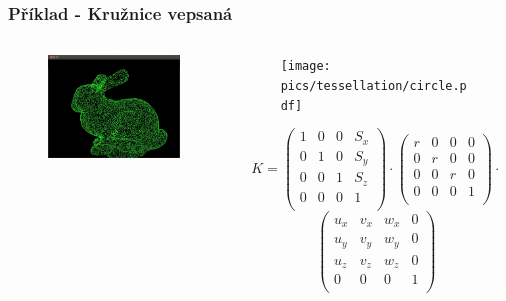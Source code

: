 \begin{frame}[fragile]
    \frametitle{Příklad - Kružnice vepsaná}
  \begin{columns}[T]
    \begin{column}{.44\textwidth}
	    \begin{figure}[h]
    		\includegraphics[width=5cm,keepaspectratio]{pics/tessellation/ts_circle}
    	\end{figure}
    \end{column}
    \begin{column}{.48\textwidth}
 	    \begin{figure}[h]
    		\texttt{[image: pics/tessellation/circle.pdf]}
    	\end{figure}
{\tiny
$$
K=
\left( 
\begin{array}{cccc} 
1 & 0 & 0 & S_x \\
0 & 1 & 0 & S_y \\
0 & 0 & 1 & S_z \\
0 & 0 & 0 & 1  \\
\end{array}
\right)
\cdot
\left( 
\begin{array}{cccc} 
r & 0 & 0 & 0 \\
0 & r & 0 & 0 \\
0 & 0 & r & 0 \\
0 & 0 & 0 & 1  \\
\end{array}
\right)
\cdot$$
$$
\left( 
\begin{array}{cccc} 
u_x & v_x & w_x & 0 \\
u_y & v_y & w_y & 0 \\
u_z & v_z & w_z & 0 \\
0 & 0 & 0 & 1  \\
\end{array}
\right)
$$
}
    \end{column}
  \end{columns}
\end{frame}

